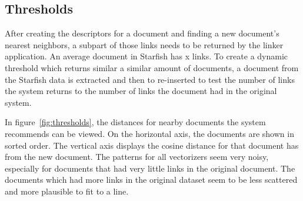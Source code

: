 \subsection{Thresholds}
After creating the descriptors for a document and finding a new document's nearest neighbors, a subpart of those links needs to be returned by the linker application. An average document in Starfish has x links. To create a dynamic threshold which returns similar a similar amount of documents, a document from the Starfish data is extracted and then to re-inserted to test the number of links the system returns to the number of links the document had in the original system.

In figure~\ref{fig:thresholds}, the distances for nearby documents the system recommends can be viewed. On the horizontal axis, the documents are shown in sorted order. The vertical axis displays the cosine distance for that document has from the new document. The patterns for all vectorizers seem very noisy, especially for documents that had very little links in the original document. The documents which had more links in the original dataset seem to be less scattered and more plausible to fit to a line.

